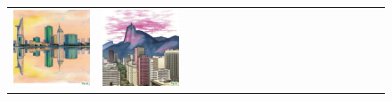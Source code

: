 \begin{figure}[ht!]
\begin{adjustwidth}{-0.8in}{-0.5in}
\begin{tabular}{cccccccccccccccccccc}
\multicolumn{2}{c}{\includegraphics[width=\threebythreecolwidth\textwidth]{figures/cherries/ink_4_saigon.jpg}} &
\multicolumn{2}{c}{\includegraphics[width=\threebythreecolwidth\textwidth]{figures/cherries/ink_5_rio.jpg}} &

\end{tabular}
\end{adjustwidth}
\end{figure}
